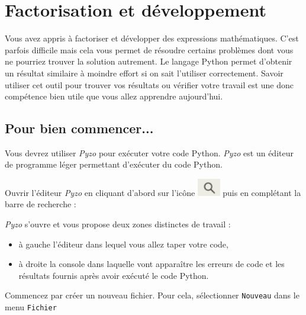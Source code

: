 \newpage

\section{Factorisation et développement}

Vous avez appris à factoriser et développer des expressions mathématiques. C'est parfois difficile mais cela vous permet de résoudre certains problèmes dont vous ne pourriez trouver la solution autrement. Le langage Python permet d'obtenir un résultat similaire à moindre effort si on sait l'utiliser correctement. Savoir utiliser cet outil pour trouver vos résultats ou vérifier votre travail est une donc compétence bien utile que vous allez apprendre aujourd'hui.\\

\subsection{Pour bien commencer...}

Vous devrez utiliser \emph{Pyzo} pour exécuter votre code Python. \emph{Pyzo} est un éditeur de programme léger permettant d'exécuter du code Python. 

Ouvrir l'éditeur \emph{Pyzo} en cliquant d'abord sur l'icône \includegraphics[width=1cm]{./images/activite7/icone_recherche} puis en complétant la barre de recherche : 


\emph{Pyzo} s'ouvre et vous propose deux zones distinctes de travail :
\begin{itemize}
\item à gauche l'éditeur dans lequel vous allez taper votre code,
\item à droite la console dans laquelle vont apparaître les erreurs de code et les résultats fournis après avoir exécuté le code Python.
\end{itemize}


Commencez par créer un nouveau fichier. Pour cela, sélectionner \texttt{Nouveau} dans le menu \texttt{Fichier}


